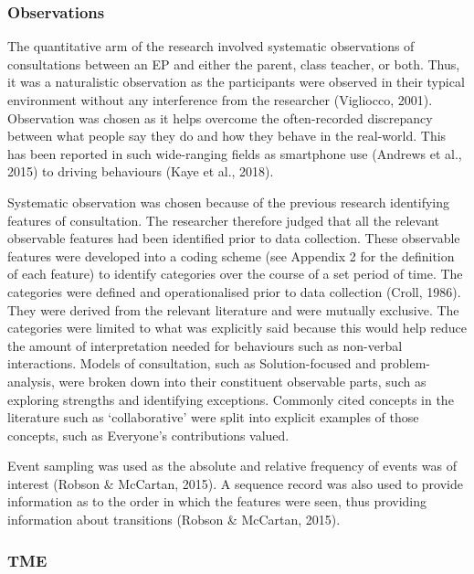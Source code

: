 \documentclass[
  english,
  man,floatsintext]{apa6}
\begin{document}
\hypertarget{observations}{%
\subsubsection{Observations}\label{observations}}

The quantitative arm of the research involved systematic observations of
consultations between an EP and either the parent, class teacher, or
both. Thus, it was a naturalistic observation as the participants were
observed in their typical environment without any interference from the
researcher (Vigliocco, 2001). Observation was
chosen as it helps overcome the often-recorded discrepancy between what
people say they do and how they behave in the real-world. This has been
reported in such wide-ranging fields as smartphone use
(Andrews et al., 2015) to driving behaviours
(Kaye et al., 2018).

Systematic observation was chosen because of the previous research
identifying features of consultation. The researcher therefore judged
that all the relevant observable features had been identified prior to
data collection. These observable features were developed into a coding
scheme (see Appendix 2 for the definition of each feature) to identify
categories over the course of a set period of time. The categories were
defined and operationalised prior to data collection
(Croll, 1986). They were derived from the
relevant literature and were mutually exclusive. The categories were
limited to what was explicitly said because this would help reduce the
amount of interpretation needed for behaviours such as non-verbal
interactions. Models of consultation, such as Solution-focused and
problem-analysis, were broken down into their constituent observable
parts, such as exploring strengths and identifying exceptions. Commonly
cited concepts in the literature such as `collaborative' were split into
explicit examples of those concepts, such as Everyone's contributions
valued.

Event sampling was used as the absolute and relative frequency of events
was of interest (Robson \& McCartan, 2015). A sequence record was
also used to provide information as to the order in which the features
were seen, thus providing information about transitions
(Robson \& McCartan, 2015).

\hypertarget{tme}{%
\subsubsection{TME}\label{tme}}
\end{document}
